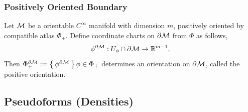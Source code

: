 \documentclass[../main.tex]{subfiles}
\begin{document}
    \subsubsection{Positively Oriented Boundary}
    \begin{definition}\label{def:positive-boundary}
        Let \(\manifold[M]\) be a orientable \(C^\infty\) manifold with dimension 
        \(m\), positively oriented by compatible atlas \(\Phi_+\). Define coordinate 
        charts on \(\partial \manifold[M]\) from \(\Phi\) as follows, 
        \[
        \phi^{\partial \manifold[M]} : U_\phi \cap \partial \manifold[M] 
        \to \mathbb{R}^{m-1}, 
        \]
        Then \(\Phi^{\partial \manifold[M]}_+ := 
        \Set{\phi^{\partial \manifold[M]}}{ \phi \in \Phi_+}\) determines an 
        orientation on \(\partial \manifold[M]\), called the positive orientation.
    \end{definition}

    \subsection{Pseudoforms (Densities)}
\end{document}
